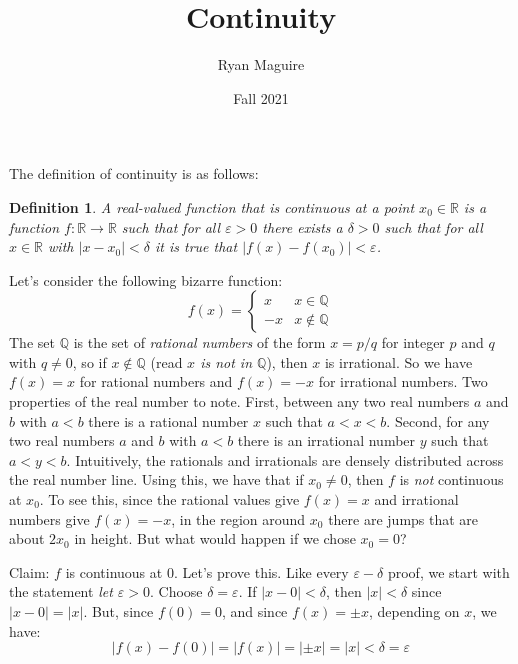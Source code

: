 \documentclass{article}
\title{Continuity}
\author{Ryan Maguire}
\date{Fall 2021}
\theoremstyle{normal}
\newtheorem{definition}{Definition}
\begin{document}
    \maketitle
    The definition of continuity is as follows:
    \begin{definition}
        A real-valued function that is continuous at a point
        $x_{0}\in\mathbb{R}$ is a function $f:\mathbb{R}\rightarrow\mathbb{R}$
        such that for all $\varepsilon>0$ there exists a $\delta>0$ such that
        for all $x\in\mathbb{R}$ with $|x-x_{0}|<\delta$ it is true that
        $|f(x)-f(x_{0})|<\varepsilon$.
    \end{definition}
    Let's consider the following bizarre function:
    \begin{equation}
        f(x)=
        \begin{cases}
            x&x\in\mathbb{Q}\\
            -x&x\notin\mathbb{Q}
        \end{cases}
    \end{equation}
    The set $\mathbb{Q}$ is the set of \textit{rational numbers} of the
    form $x=p/q$ for integer $p$ and $q$ with $q\ne{0}$, so if
    $x\notin\mathbb{Q}$ (read \textit{$x$ is not in $\mathbb{Q}$}), then
    $x$ is irrational. So we have $f(x)=x$ for rational numbers and
    $f(x)=-x$ for irrational numbers. Two properties of the real number to
    note. First, between any two real numbers $a$ and $b$ with $a<b$ there is a
    rational number $x$ such that $a<x<b$. Second, for any two real numbers
    $a$ and $b$ with $a<b$ there is an irrational number $y$ such that $a<y<b$.
    Intuitively, the rationals and irrationals are densely distributed across
    the real number line. Using this, we have that if $x_{0}\ne{0}$, then
    $f$ is \textit{not} continuous at $x_{0}$. To see this, since the rational
    values give $f(x)=x$ and irrational numbers give $f(x)=-x$, in the region
    around $x_{0}$ there are jumps that are about $2x_{0}$ in height. But what
    would happen if we chose $x_{0}=0$?
    \par\hfill\par
    Claim: $f$ is continuous at $0$. Let's prove this. Like every
    $\varepsilon-\delta$ proof, we start with the statement
    \textit{let $\varepsilon>0$}. Choose $\delta=\varepsilon$. If
    $|x-0|<\delta$, then $|x|<\delta$ since $|x-0|=|x|$. But, since $f(0)=0$,
    and since $f(x)=\pm{x}$, depending on $x$, we have:
    \begin{equation}
        |f(x)-f(0)|=|f(x)|=|\pm{x}|=|x|<\delta=\varepsilon
    \end{equation}
\end{document}
